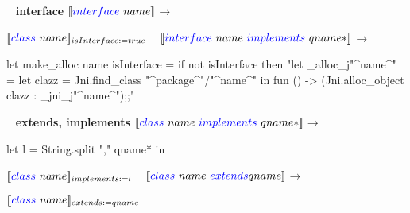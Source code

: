 \documentclass[a4paper, 11pt]{report}
\begin{document}
\ 
\newline
\textbf{ interface }
\newline
\noindent
$[\![{\color{blue}interface}\  name ]\!]$$\longrightarrow$
% 

$[\![{\color{blue}class}\  name ]\!]_{isInterface:=true}$
\newline
\ 
\newline
\noindent
$[\![{\color{blue}interface}\  name\ {\color{blue}implements}\ qname* ]\!]$$\longrightarrow$
% 

\begin{OCaml}
let make_alloc name isInterface =
   if not isInterface then
      "let _alloc_j"^name^" =
       let clazz = Jni.find_class "^package^"/"^name^"
       in fun () -> (Jni.alloc_object clazz : _jni_j"^name^");;"
\end{OCaml}

\ 
\newline
\textbf{extends, implements}
\newline
\noindent
$[\![{\color{blue}class}\  name\ {\color{blue}implements}\ qname* ]\!]$$\longrightarrow$
% 

let l = String.split "," qname* in

$[\![{\color{blue}class}\  name ]\!]_{implements:=l}$
\newline
\ 
\newline
\noindent
\noindent
$[\![  {\color{blue}class}\ name\ {\color{blue}extends} qname ]\!]$$\longrightarrow$

$[\![  {\color{blue}class}\ name]\!]_{extends:=qname}$
\end{document}
